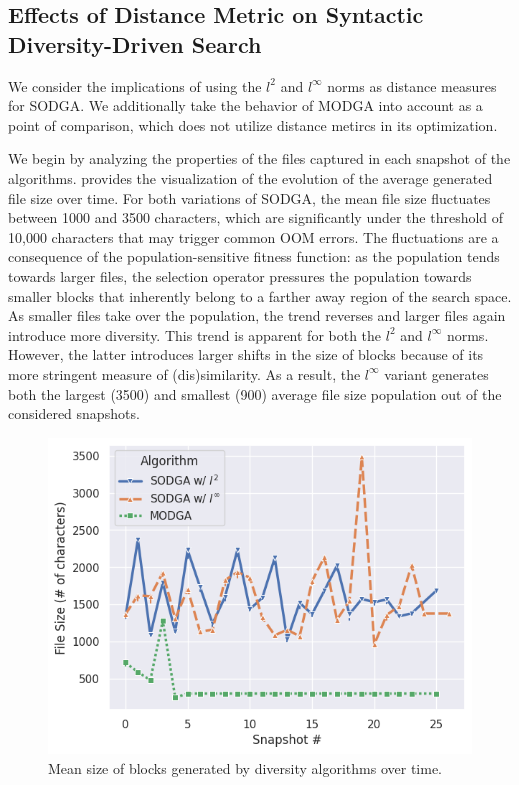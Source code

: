 \subsection{\label{subsec:distance_effect}Effects of Distance Metric on Syntactic Diversity-Driven Search}

We consider the implications of using the $l^2$ and $l^\infty$ norms as distance
measures for \gls{SODGA}.
We additionally take the behavior of \gls{MODGA} into account as a point of comparison,
which does not utilize distance metircs in its optimization.

We begin by analyzing the properties of the files captured in
each snapshot of the algorithms.
 provides the visualization of the evolution of the
average generated file size over time.
For both variations of \gls{SODGA}, the mean file size
fluctuates between 1000 and 3500 characters,
which are significantly under the threshold of 10,000 characters
that may trigger common \gls{OOM} errors.
The fluctuations are a consequence of the population-sensitive fitness function:
as the population tends towards larger files, the selection operator
pressures the population towards smaller blocks that inherently 
belong to a farther away region of the search space.
As smaller files take over the population, the trend reverses and larger
files again introduce more diversity.
This trend is apparent for both the $l^2$ and $l^\infty$ norms.
However, the latter introduces larger shifts in the size of blocks because of its
more stringent measure of (dis)similarity.
As a result, the $l^\infty$ variant generates 
both the largest (3500) and smallest (900) average file size population
out of the considered snapshots.

\begin{figure}
    \centering
    \includegraphics[scale=0.6]{img/rq1-2/rq1-2file-size.png}
    \caption{Mean size of blocks generated by diversity algorithms over time.}
    \label{fig:rq1-2size}
\end{figure}

